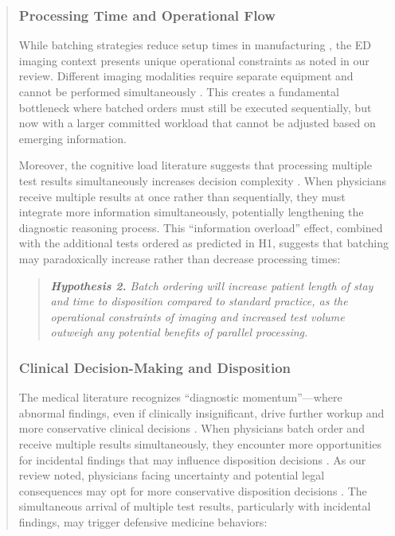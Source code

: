 \documentclass[11pt]{article}
\newcommand{\1}{\hbox{\rm 1\kern-.35em 1}}
\begin{document}
\begin{quote}
\subsubsection*{Processing Time and Operational Flow}

While batching strategies reduce setup times in manufacturing \citep{Fowler2022}, the ED imaging context presents unique operational constraints as noted in our review. Different imaging modalities require separate equipment and cannot be performed simultaneously \citep{Jessome2020}. This creates a fundamental bottleneck where batched orders must still be executed sequentially, but now with a larger committed workload that cannot be adjusted based on emerging information.

Moreover, the cognitive load literature suggests that processing multiple test results simultaneously increases decision complexity \citep{kc2013does}. When physicians receive multiple results at once rather than sequentially, they must integrate more information simultaneously, potentially lengthening the diagnostic reasoning process. This ``information overload'' effect, combined with the additional tests ordered as predicted in H1, suggests that batching may paradoxically increase rather than decrease processing times:

\begin{quote}
\small
\textit{\textbf{Hypothesis 2.} Batch ordering will increase patient length of stay and time to disposition compared to standard practice, as the operational constraints of imaging and increased test volume outweigh any potential benefits of parallel processing.}
\end{quote}

\subsubsection*{Clinical Decision-Making and Disposition}

The medical literature recognizes ``diagnostic momentum''---where abnormal findings, even if clinically insignificant, drive further workup and more conservative clinical decisions \citep{coen2022clinical, featherston2020decision}. When physicians batch order and receive multiple results simultaneously, they encounter more opportunities for incidental findings that may influence disposition decisions \citep{lumbreras2010incidental, berlin2011incidentaloma}. As our review noted, physicians facing uncertainty and potential legal consequences may opt for more conservative disposition decisions \citep{rao2012overuse, lam2020why}. The simultaneous arrival of multiple test results, particularly with incidental findings, may trigger defensive medicine behaviors:


\end{quote}
\end{document}
